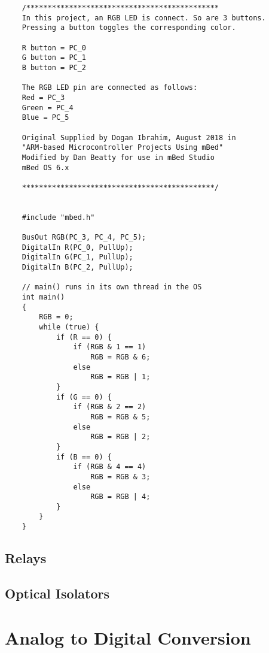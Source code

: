 \documentclass{article}
\begin{document}
\begin{lstlisting}
	/*********************************************
	In this project, an RGB LED is connect. So are 3 buttons. 
	Pressing a button toggles the corresponding color.

	R button = PC_0
	G button = PC_1
	B button = PC_2

	The RGB LED pin are connected as follows:
	Red = PC_3
	Green = PC_4
	Blue = PC_5

	Original Supplied by Dogan Ibrahim, August 2018 in 
	"ARM-based Microcontroller Projects Using mBed"
	Modified by Dan Beatty for use in mBed Studio 
	mBed OS 6.x
	
	*********************************************/


	#include "mbed.h"

	BusOut RGB(PC_3, PC_4, PC_5);
	DigitalIn R(PC_0, PullUp);
	DigitalIn G(PC_1, PullUp);
	DigitalIn B(PC_2, PullUp);

	// main() runs in its own thread in the OS
	int main()
	{
		RGB = 0;
	    while (true) {
			if (R == 0) {
				if (RGB & 1 == 1)
					RGB = RGB & 6;
				else
					RGB = RGB | 1;
			}
			if (G == 0) {
				if (RGB & 2 == 2)
					RGB = RGB & 5;
				else
					RGB = RGB | 2;
			}
			if (B == 0) {
				if (RGB & 4 == 4)
					RGB = RGB & 3;
				else
					RGB = RGB | 4;
			}
	    }
	}
\end{lstlisting}




\subsection{Relays} %
\label{sub:relays}




\subsection{Optical Isolators} %
\label{sub:optical_isolators}

%




\section{Analog to Digital Conversion} %
\label{sec:analog_to_digital_conversion}
\end{document}
